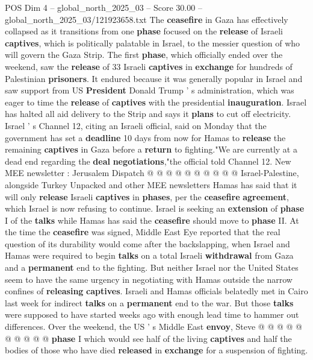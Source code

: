 \begin{textsample}{POS Dim 4 – global\_north\_2025\_03 – Score 30.00 – global\_north\_2025\_03/121923658.txt}  \label{ex:f4_pos_067}
The \textbf{ceasefire} in Gaza has effectively collapsed as it transitions from one \textbf{phase} focused on the \textbf{release} of Israeli \textbf{captives}, which is politically palatable in Israel, to the messier question of who will govern the Gaza Strip.
The first \textbf{phase}, which officially ended over the weekend, saw the \textbf{release} of 33 Israeli \textbf{captives} in \textbf{exchange} for hundreds of Palestinian \textbf{prisoners}.
It endured because it was generally popular in Israel and saw support from US \textbf{President} Donald Trump ' s administration, which was eager to time the \textbf{release} of \textbf{captives} with the presidential \textbf{inauguration}.
Israel has halted all aid delivery to the Strip and says it \textbf{plans} to cut off electricity.
Israel ' s Channel 12, citing an Israeli official, said on Monday that the government has set a \textbf{deadline} 10 days from now for Hamas to \textbf{release} the remaining \textbf{captives} in Gaza before a \textbf{return} to fighting."We are currently at a dead end regarding the \textbf{deal} \textbf{negotiations},"the official told Channel 12.
New MEE newsletter : Jerusalem Dispatch @ @ @ @ @ @ @ @ @ @ Israel-Palestine, alongside Turkey Unpacked and other MEE newsletters Hamas has said that it will only \textbf{release} Israeli \textbf{captives} in \textbf{phases}, per the \textbf{ceasefire} \textbf{agreement}, which Israel is now refusing to continue.
Israel is seeking an \textbf{extension} of \textbf{phase} I of the \textbf{talks} while Hamas has said the \textbf{ceasefire} should move to \textbf{phase} II.
At the time the \textbf{ceasefire} was signed, Middle East Eye reported that the real question of its durability would come after the backslapping, when Israel and Hamas were required to begin \textbf{talks} on a total Israeli \textbf{withdrawal} from Gaza and a \textbf{permanent} end to the fighting.
But neither Israel nor the United States seem to have the same urgency in negotiating with Hamas outside the narrow confines of \textbf{releasing} \textbf{captives}.
Israeli and Hamas officials belatedly met in Cairo last week for indirect \textbf{talks} on a \textbf{permanent} end to the war.
But those \textbf{talks} were supposed to have started weeks ago with enough lead time to hammer out differences.
Over the weekend, the US ' s Middle East \textbf{envoy}, Steve @ @ @ @ @ @ @ @ @ @ \textbf{phase} I which would see half of the living \textbf{captives} and half the bodies of those who have died \textbf{released} in \textbf{exchange} for a suspension of fighting.

\end{textsample}
